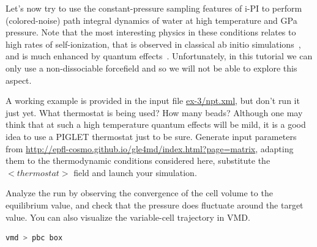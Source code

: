 \documentclass{article}
\begin{document}
\begin{Exercise}[label={npt},title={Variable-cell sampling}]

Let's now try to use the constant-pressure sampling features of i-PI to 
perform (colored-noise) path integral dynamics of water at high temperature
and GPa pressure. Note that the most interesting physics in these conditions
relates to high rates of self-ionization, that is observed in classical ab 
initio simulations~\cite{schw+01prl}, and is much enhanced by quantum 
effects~\cite{ceri+14cpc}. Unfortunately, in this tutorial we can only use
a non-dissociable forcefield and so we will not be able to explore this
aspect. 

\Question A working example is provided in the input file \url{ex-3/npt.xml}, 
but don't run it just yet. What thermostat is being used? How many beads? 
Although one may think that at such a high temperature quantum effects will be 
mild, it is a good idea to use a PIGLET thermostat just to be sure. 
Generate input parameters from \url{http://epfl-cosmo.github.io/gle4md/index.html?page=matrix},
adapting them to the thermodynamic conditions considered here, substitute
the \lstinxml$<thermostat>$ field and launch your simulation. 

\Question Analyze the run by observing the convergence of the cell volume
to the equilibrium value, and check that the pressure does fluctuate around the
target value. You can also visualize the variable-cell trajectory in VMD.
\begin{lstlisting}[language=bash]
vmd > pbc box
\end{lstlisting}



\end{Exercise}
\end{document}
